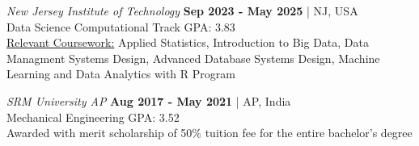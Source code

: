  \textit{New Jersey Institute of Technology} {\hfill \textbf{Sep 2023 - May 2025} | NJ, USA} \\
{Data Science Computational Track \hfill GPA: 3.83} \\
{\underline{Relevant Coursework:} Applied Statistics, Introduction to Big Data, Data Managment Systems Design, Advanced Database Systems Design, Machine Learning and Data Analytics with R Program}

\vspace{.5em}

 \textit{SRM University AP} {\hfill \textbf{Aug 2017 - May 2021} | AP, India} \\
{Mechanical Engineering \hfill GPA: 3.52} \\
{Awarded with merit scholarship of 50\% tuition fee for the entire bachelor's degree} \\










